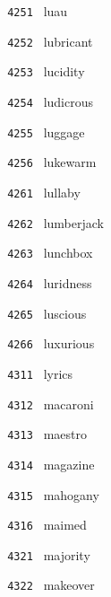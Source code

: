 \documentclass[11pt]{article}
\begin{document}
\begin{multicols}{6}
\noindent \texttt{ 4251 } \hspace{1mm} luau  \par
\noindent \texttt{ 4252 } \hspace{1mm} lubricant  \par
\noindent \texttt{ 4253 } \hspace{1mm} lucidity  \par
\noindent \texttt{ 4254 } \hspace{1mm} ludicrous  \par
\noindent \texttt{ 4255 } \hspace{1mm} luggage  \par
\noindent \texttt{ 4256 } \hspace{1mm} lukewarm  \par
\noindent \texttt{ 4261 } \hspace{1mm} lullaby  \par
\noindent \texttt{ 4262 } \hspace{1mm} lumberjack  \par
\noindent \texttt{ 4263 } \hspace{1mm} lunchbox  \par
\noindent \texttt{ 4264 } \hspace{1mm} luridness  \par
\noindent \texttt{ 4265 } \hspace{1mm} luscious  \par
\noindent \texttt{ 4266 } \hspace{1mm} luxurious  \par
\noindent \texttt{ 4311 } \hspace{1mm} lyrics  \par
\noindent \texttt{ 4312 } \hspace{1mm} macaroni  \par
\noindent \texttt{ 4313 } \hspace{1mm} maestro  \par
\noindent \texttt{ 4314 } \hspace{1mm} magazine  \par
\noindent \texttt{ 4315 } \hspace{1mm} mahogany  \par
\noindent \texttt{ 4316 } \hspace{1mm} maimed  \par
\noindent \texttt{ 4321 } \hspace{1mm} majority  \par
\noindent \texttt{ 4322 } \hspace{1mm} makeover  \par

\end{multicols}
\end{document}
